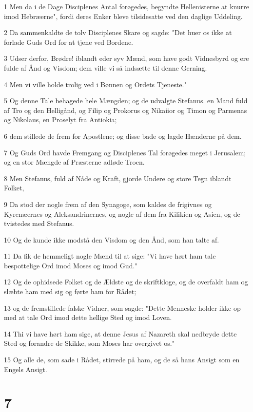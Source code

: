 \par 1 Men da i de Dage Disciplenes Antal forøgedes, begyndte Hellenisterne at knurre imod Hebræerne", fordi deres Enker bleve tilsidesatte ved den daglige Uddeling.
\par 2 Da sammenkaldte de tolv Disciplenes Skare og sagde: "Det huer os ikke at forlade Guds Ord for at tjene ved Bordene.
\par 3 Udser derfor, Brødre! iblandt eder syv Mænd, som have godt Vidnesbyrd og ere fulde af Ånd og Visdom; dem ville vi så indsætte til denne Gerning.
\par 4 Men vi ville holde trolig ved i Bønnen og Ordets Tjeneste."
\par 5 Og denne Tale behagede hele Mængden; og de udvalgte Stefanus. en Mand fuld af Tro og den Helligånd, og Filip og Prokorus og Nikaiior og Timon og Parmenas og Nikolaus, en Proselyt fra Antiokia;
\par 6 dem stillede de frem for Apostlene; og disse bade og lagde Hænderne på dem.
\par 7 Og Guds Ord havde Fremgang og Disciplenes Tal forøgedes meget i Jerusalem; og en stor Mængde af Præsterne adløde Troen.
\par 8 Men Stefanus, fuld af Nåde og Kraft, gjorde Undere og store Tegn iblandt Folket,
\par 9 Da stod der nogle frem af den Synagoge, som kaldes de frigivnes og Kyrenæernes og Aleksandrinernes, og nogle af dem fra Kilikien og Asien, og de tvistedes med Stefanus.
\par 10 Og de kunde ikke modstå den Visdom og den Ånd, som han talte af.
\par 11 Da fik de hemmeligt nogle Mænd til at sige: "Vi have hørt ham tale bespottelige Ord imod Moses og imod Gud."
\par 12 Og de ophidsede Folket og de Ældste og de skriftkloge, og de overfaldt ham og slæbte ham med sig og førte ham for Rådet;
\par 13 og de fremstillede falske Vidner, som sagde: "Dette Menneske holder ikke op med at tale Ord imod dette hellige Sted og imod Loven.
\par 14 Thi vi have hørt ham sige, at denne Jesus af Nazareth skal nedbryde dette Sted og forandre de Skikke, som Moses har overgivet os."
\par 15 Og alle de, som sade i Rådet, stirrede på ham, og de så hans Ansigt som en Engels Ansigt.

\chapter{7}

